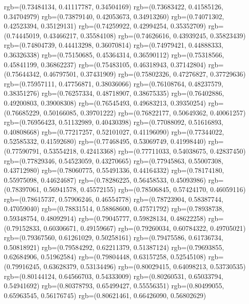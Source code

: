 {{        rgb=(0.73484134, 0.41117787, 0.34504169)
        rgb=(0.73683422, 0.41585126, 0.34704979)
        rgb=(0.73879140, 0.42053673, 0.34913260)
        rgb=(0.74071302, 0.42523394, 0.35129131)
        rgb=(0.74259922, 0.42994254, 0.35352709)
        rgb=(0.74445019, 0.43466217, 0.35584108)
        rgb=(0.74626616, 0.43939245, 0.35823439)
        rgb=(0.74804739, 0.44413298, 0.36070814)
        rgb=(0.74979421, 0.44888333, 0.36326338)
        rgb=(0.75150685, 0.45364314, 0.36590112)
        rgb=(0.75318566, 0.45841199, 0.36862237)
        rgb=(0.75483105, 0.46318943, 0.37142804)
        rgb=(0.75644342, 0.46797501, 0.37431909)
        rgb=(0.75802326, 0.47276827, 0.37729636)
        rgb=(0.75957111, 0.47756871, 0.38036066)
        rgb=(0.76108764, 0.48237579, 0.38351276)
        rgb=(0.76257334, 0.48718907, 0.38675335)
        rgb=(0.76402886, 0.49200803, 0.39008308)
        rgb=(0.76545493, 0.49683213, 0.39350254)
        rgb=(0.76685229, 0.50166085, 0.39701222)
        rgb=(0.76822177, 0.50649362, 0.40061257)
        rgb=(0.76956423, 0.51132989, 0.40430398)
        rgb=(0.77088092, 0.51616893, 0.40808668)
        rgb=(0.77217257, 0.52101027, 0.41196090)
        rgb=(0.77344022, 0.52585332, 0.41592680)
        rgb=(0.77468495, 0.53069749, 0.41998440)
        rgb=(0.77590791, 0.53554218, 0.42413368)
        rgb=(0.77711033, 0.54038675, 0.42837450)
        rgb=(0.77829346, 0.54523059, 0.43270665)
        rgb=(0.77945863, 0.55007308, 0.43712980)
        rgb=(0.78060775, 0.55491336, 0.44164332)
        rgb=(0.78174180, 0.55975098, 0.44624687)
        rgb=(0.78286225, 0.56458533, 0.45093986)
        rgb=(0.78397061, 0.56941578, 0.45572155)
        rgb=(0.78506845, 0.57424170, 0.46059116)
        rgb=(0.78615737, 0.57906246, 0.46554778)
        rgb=(0.78723904, 0.58387744, 0.47059040)
        rgb=(0.78831514, 0.58868600, 0.47571792)
        rgb=(0.78938738, 0.59348754, 0.48092914)
        rgb=(0.79045777, 0.59828134, 0.48622258)
        rgb=(0.79152833, 0.60306671, 0.49159667)
        rgb=(0.79260034, 0.60784322, 0.49705021)
        rgb=(0.79367560, 0.61261029, 0.50258161)
        rgb=(0.79475586, 0.61736734, 0.50818921)
        rgb=(0.79584292, 0.62211379, 0.51387124)
        rgb=(0.79693855, 0.62684906, 0.51962584)
        rgb=(0.79804448, 0.63157258, 0.52545108)
        rgb=(0.79916245, 0.63628379, 0.53134496)
        rgb=(0.80029415, 0.64098213, 0.53730535)
        rgb=(0.80144124, 0.64566703, 0.54333009)
        rgb=(0.80260531, 0.65033794, 0.54941692)
        rgb=(0.80378793, 0.65499427, 0.55556351)
        rgb=(0.80499055, 0.65963545, 0.56176745)
        rgb=(0.80621461, 0.66426090, 0.56802629)
}}
